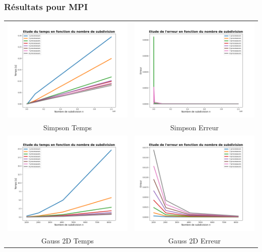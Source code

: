 \documentclass[10pt]{beamer}
\begin{document}
\begin{frame}
    \frametitle{Résultats pour MPI}
        \small
    \begin{tabular}{cc}
        \includegraphics[width=0.45\linewidth]{Images/time_simp_MPI.png} &
        \includegraphics[width=0.45\linewidth]{Images/error_simp_MPI.png} \\
        Simpson Temps & Simpson Erreur \\
        \includegraphics[width=0.45\linewidth]{Images/time_gauss_MPI.png} &
        \includegraphics[width=0.45\linewidth]{Images/error_gauss_MPI.png} \\
        Gauss 2D Temps & Gauss 2D Erreur \\
    \end{tabular}
        
\end{frame}
\end{document}
